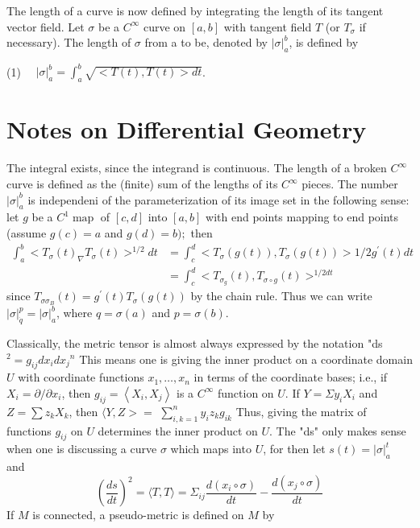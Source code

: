 \documentclass[10pt]{article}
\begin{document}
The length of a curve is now defined by integrating the length of its tangent vector field. Let $\sigma$ be a $C^{\infty}$ curve on $[a, b]$ with tangent field $T$ (or $T_{\sigma}$ if necessary). The length of $\sigma$ from a to be, denoted by $|\sigma|_{a}^{b}$, is defined by

(1) $\quad|\sigma|_{a}^{b}=\int_{a}^{b} \sqrt{<T(t), T(t)>d t}$.

\section{Notes on Differential Geometry}
The integral exists, since the integrand is continuous. The length of a broken $C^{\infty}$ curve is defined as the (finite) sum of the lengths of its $C^{\infty}$ pieces. The number $|\sigma|_{a}^{b}$ is independeni of the parameterization of its image set in the following sense: let $g$ be a $C^{1} \operatorname{map}$ of $[c, d]$ into $[a, b]$ with end points mapping to end points (assume $g(c)=a$ and $g(d)=b) ;$ then
$$
\begin{aligned}
\int_{a}^{b}<T_{\sigma}(t)_{\nabla} T_{\sigma}(t)>^{1 / 2} d t &=\int_{c}^{d}<T_{\sigma}(g(t)), T_{\sigma}(g(t))>1 / 2 g^{\prime}(t) d t \\
&=\int_{c}^{d}<T_{\sigma_{g}}(t), T_{\sigma \circ g}(t)>^{1 / 2 d t}
\end{aligned}
$$
since $T_{\sigma \sigma_{B}}(t)=g^{\prime}(t) T_{\sigma}(g(t))$ by the chain rule. Thus we can write $|\sigma|_{\dot{q}}^{p}=|\sigma|_{a}^{b}$, where $q=\sigma(a)$ and $p=\sigma(b)$.

Classically, the metric tensor is almost always expressed by the notation "ds ${ }^{2}=g_{i j} d x_{i} d x_{j}{ }^{n}$ This means one is giving the inner product on a coordinate domain $U$ with coordinate functions $x_{1}, \ldots, x_{n}$ in terms of the coordinate bases; i.e., if $X_{i}=\partial / \partial x_{i}$, then $g_{i j}=\left\langle X_{i}, X_{j}\right\rangle$ is a $C^{\infty}$ function on $U$. If $Y=\Sigma y_{i} X_{i}$ and $Z=\sum z_{k} X_{k}$, then $\langle Y, Z>=$ $\sum_{i, k=1}^{n} y_{i} z_{k} g_{i k}$ Thus, giving the matrix of functions $g_{i j}$ on $U$ determines the inner product on $U$. The "ds" only makes sense when one is discussing a curve $\sigma$ which maps into $U$, for then let $s(t)=|\sigma|_{a}^{t}$ and
$$
\left(\frac{d s}{d t}\right)^{2}=\langle T, T\rangle=\Sigma_{i j} \frac{d\left(x_{i} \circ \sigma\right)}{d t}-\frac{d\left(x_{j} \circ \sigma\right)}{d t}
$$
If $M$ is connected, a pseudo-metric is defined on $M$ by
\end{document}
